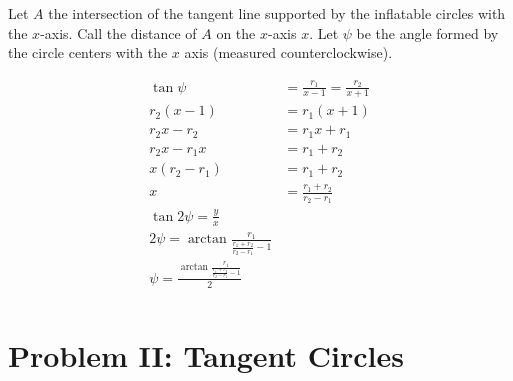 \documentclass{article}
\begin{document}
Let $A$ the intersection of the tangent line supported
by the inflatable circles with the $x$-axis. Call the distance of $A$
on the $x$-axis $x$. Let $\psi$ be the angle formed by the
circle centers with the $x$ axis (measured counterclockwise).

\begin{align}
  \tan{\psi} &= \frac{r_1}{x-1} = \frac{r_2}{x+1}  \\
  r_2(x - 1) &= r_1(x+1) \\
  r_2x - r_2 &= r_1x + r_1 \\
  r_2x - r_1x &= r_1 + r_2 \\
  x(r_2 - r_1) &= r_1 + r_2 \\
  x &= \frac{r_1+r_2}{r_2 - r_1} \\
  \tan{2 \psi} = \frac{y}{x} \\
  2 \psi = \arctan{\frac{r_1}{\frac{r_1+r_2}{r_2-r_1} - 1}} \\
     \psi = \frac{\arctan{\frac{r_1}{\frac{r_1+r_2}{r_2-r_1} - 1}}}{2} \\
\end{align}





\section{Problem II: Tangent Circles}
\end{document}
